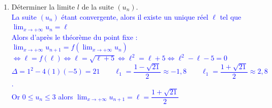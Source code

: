 \documentclass[11pt,twoside, openany]{extbook}
\begin{document}
\begin{application}{}
\begin{enumerate}
{\begin{itemize}
\begin{align*}
    \end{align*}
    Ainsi, si la propriété est vraie pour $n$, elle est aussi vraie pour $n + 1$.
    \item Étape 3 : Conclusion \\
    Par le principe de récurrence, pour tout ${n\in\N.}$, $0\leq u_n\leq 3$.
 \end{itemize}
Déduisons-en que la suite $(u_n)$ est convergente.\\
$\forall n \in\N, \quad 0\leq u_n\leq 3 $ donc la suite $(u_n)$ est bornée, elle est alors convergente.}
    \item Déterminer la limite $l$ de la suite $(u_n)$.\\
     \textcolor{blue}{ La suite $(u_n)$ étant convergente, alors il existe un unique réel $\ell$ tel que $ \displaystyle\lim_{x \to +\infty}u_n =\ell$\\ Alors d'après le théorème du point fixe : \vspace{1em}\\ 
    $ \displaystyle\lim_{x \to +\infty}u_{n+1}=f(\displaystyle\lim_{x \to +\infty}u_n)$} \vspace{1em}\\ 
    \textcolor{blue}{$\iff \ell = f(\ell) \iff \ell=\sqrt{\ell + 5} \iff \ell^2 = \ell + 5 \iff  \ell^2 - \ell - 5 =0 $\vspace{1em}\\ 
    $\Delta = 1^2-4(1)(-5)=21 \qquad \ell_1=\dfrac{1-\sqrt{21}}{2} \approx -1,8 \qquad \ell_1=\dfrac{1+\sqrt{21}}{2}\approx 2,8$.\vspace{1em}\\ 
    Or $0\leq u_n\leq 3$ alors $\displaystyle\lim_{x \to +\infty}u_{n+1}=\ell=\dfrac{1+\sqrt{21}}{2}$} 
\end{enumerate}
\end{application}



\label{LastPage}
\end{document}
